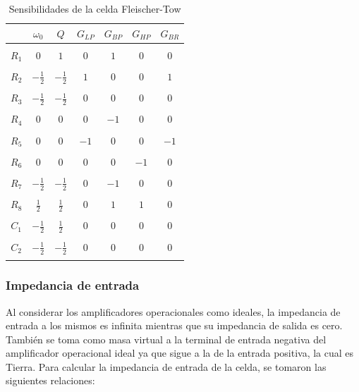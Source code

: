 \begin{table}[H]
	\centering
	\begin{tabular}{c c c c c c c}
		& $\omega_0$ & $Q$ &$G_{LP}$ & $G_{BP}$& $G_{HP}$& $G_{BR}$\\
		\hline \\ 
		$R_1$ & $0$ & $1$ & $0$ & $1$ & $0$ & $0$\\ \\
		$R_2$ & $-\frac{1}{2}$ & $-\frac{1}{2}$ & $1$ & $0$ & $0$ & $1$\\ \\
		$R_3$ & $-\frac{1}{2}$ & $-\frac{1}{2}$ & $0$ & $0$ & $0$ & $0$\\ \\
		$R_4$ & $0$ & $0$ & $0$ & $-1$ & $0$ & $0$\\ \\
		$R_5$ & $0$ & $0$ & $-1$ & $0$ & $0$ & $-1$\\ \\
		$R_6$ & $0$ & $0$ & $0$ & $0$ & $-1$ & $0$\\ \\
		$R_7$ & $-\frac{1}{2}$ & $-\frac{1}{2}$ & $0$ & $-1$ & $0$ & $0$\\ \\
		$R_8$ & $\frac{1}{2}$ & $\frac{1}{2}$ & $0$ & $1$ & $1$ & $0$\\ \\
		$C_1$ & $-\frac{1}{2}$ & $\frac{1}{2}$ & $0$ & $0$ & $0$ & $0$\\ \\
		$C_2$ & $-\frac{1}{2}$ & $-\frac{1}{2}$ & $0$ & $0$ & $0$ & $0$\\ \\
		\hline
	\end{tabular}
	\caption{Sensibilidades de la celda Fleischer-Tow}
	\label{sens_am}
\end{table}

\subsubsection{Impedancia de entrada}
Al considerar los amplificadores operacionales como ideales, la impedancia de entrada a los mismos es infinita mientras que su impedancia de salida es cero. Tambi\'en se toma como masa virtual a la terminal de entrada negativa del amplificador operacional ideal ya que sigue a la de la entrada positiva, la cual es Tierra. Para calcular la impedancia de entrada de la celda, se tomaron las siguientes relaciones:

